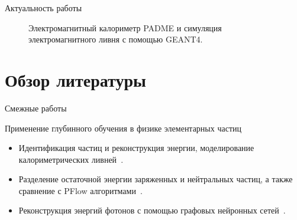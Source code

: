 \documentclass[9pt]{beamer}
\begin{document}
\begin{frame}{Актуальность работы}
    \begin{figure}
        \centering
        \qquad
        \caption{Электромагнитный калориметр PADME и симуляция электромагнитного ливня с помощью GEANT4.}
    \end{figure}
\end{frame}

\section{Обзор литературы}

\begin{frame}{Смежные работы}
    \begin{block}{Применение глубинного обучения в физике элементарных частиц}
        \begin{itemize}
            \item Идентификация частиц и реконструкция энергии, моделирование калориметрических ливней~\cite{Belayneh_2020}.
            \item Разделение остаточной энергии заряженных и нейтральных частиц, а также сравнение с PFlow алгоритмами~\cite{Di_Bello_2021}.
            \item Реконструкция энергий фотонов с помощью графовых нейронных сетей~\cite{Wemmer_2023}.
        \end{itemize}
    \end{block}
\end{frame}
\end{document}
